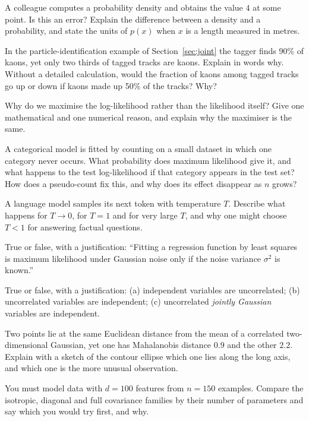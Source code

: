 \documentclass[11pt]{article}
\begin{document}
\begin{questions}
\begin{conceptual}
\item A colleague computes a probability density and obtains the value $4$ at some point. Is this an error? Explain
the difference between a density and a probability, and state the units of $p(x)$ when $x$ is a length measured in
metres.
\item In the particle-identification example of Section~\ref{sec:joint} the tagger finds 90\% of kaons, yet only two
thirds of tagged tracks are kaons. Explain in words why. Without a detailed calculation, would the fraction of kaons
among tagged tracks go up or down if kaons made up 50\% of the tracks? Why?
\item Why do we maximise the log-likelihood rather than the likelihood itself? Give one mathematical and one numerical
reason, and explain why the maximiser is the same.
\item A categorical model is fitted by counting on a small dataset in which one category never occurs. What
probability does maximum likelihood give it, and what happens to the test log-likelihood if that category appears in
the test set? How does a pseudo-count fix this, and why does its effect disappear as $n$ grows?
\item A language model samples its next token with temperature $T$. Describe what happens for $T \to 0$, for $T = 1$
and for very large $T$, and why one might choose $T < 1$ for answering factual questions.
\item True or false, with a justification: ``Fitting a regression function by least squares is maximum likelihood
under Gaussian noise only if the noise variance $\sigma^2$ is known.''
\item True or false, with a justification: (a) independent variables are uncorrelated; (b) uncorrelated variables are
independent; (c) uncorrelated \emph{jointly Gaussian} variables are independent.
\item Two points lie at the same Euclidean distance from the mean of a correlated two-dimensional Gaussian, yet one has
Mahalanobis distance $0.9$ and the other $2.2$. Explain with a sketch of the contour ellipse which one lies along the
long axis, and which one is the more unusual observation.
\item You must model data with $d = 100$ features from $n = 150$ examples. Compare the isotropic, diagonal and full
covariance families by their number of parameters and say which you would try first, and why.

\end{conceptual}
\end{questions}
\end{document}
